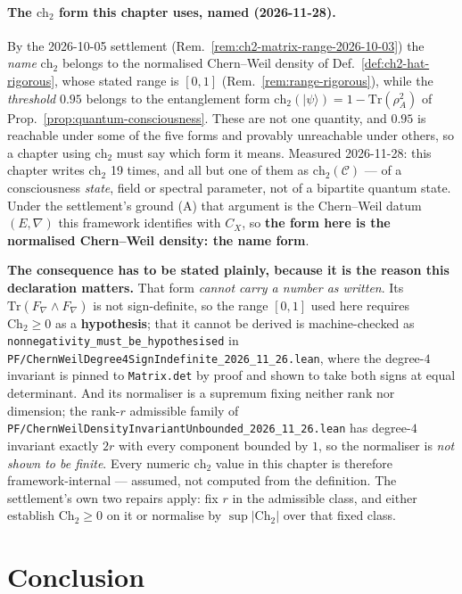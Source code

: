 \paragraph{The $\text{ch}_2$ form this chapter uses, named (2026-11-28).}
By the 2026-10-05 settlement (Rem.~\ref{rem:ch2-matrix-range-2026-10-03}) the
\emph{name} $\text{ch}_2$ belongs to the normalised Chern--Weil density of
Def.~\ref{def:ch2-hat-rigorous}, whose stated range is $[0,1]$
(Rem.~\ref{rem:range-rigorous}), while the \emph{threshold} $0.95$ belongs to the
entanglement form $\text{ch}_2(|\psi\rangle) = 1 - \mathrm{Tr}(\rho_A^2)$ of
Prop.~\ref{prop:quantum-consciousness}. These are not one quantity, and $0.95$ is
reachable under some of the five forms and provably unreachable under others, so a
chapter using $\text{ch}_2$ must say which form it means.
Measured 2026-11-28: this chapter writes $\text{ch}_2$ 19 times, and all but one of them as $\text{ch}_2(\mathcal{C})$
--- of a consciousness \emph{state}, field or spectral parameter, not of a
bipartite quantum state. Under the settlement's ground (A) that argument is the
Chern--Weil datum $(E,\nabla)$ this framework identifies with $C_X$, so
\textbf{the form here is the normalised Chern--Weil density: the name form}.

\noindent \textbf{The consequence has to be stated plainly, because it is the
reason this declaration matters.} That form \emph{cannot carry a number as
written}. Its $\mathrm{Tr}(F_\nabla \wedge F_\nabla)$ is not sign-definite, so the
range $[0,1]$ used here requires $\mathrm{Ch}_2 \geq 0$ as a \textbf{hypothesis};
that it cannot be derived is machine-checked as
\texttt{nonnegativity\_must\_be\_hypothesised} in
\texttt{PF/ChernWeilDegree4SignIndefinite\_2026\_11\_26.lean}, where the
degree-$4$ invariant is pinned to \texttt{Matrix.det} by proof and shown to take
both signs at equal determinant. And its normaliser is a supremum fixing neither
rank nor dimension; the rank-$r$ admissible family of
\texttt{PF/ChernWeilDensityInvariantUnbounded\_2026\_11\_26.lean} has degree-$4$
invariant exactly $2r$ with every component bounded by $1$, so the normaliser is
\emph{not shown to be finite}. Every numeric $\text{ch}_2$ value in this chapter
is therefore framework-internal --- assumed, not computed from the definition.
The settlement's own two repairs apply: fix $r$ in the admissible class, and
either establish $\mathrm{Ch}_2 \geq 0$ on it or normalise by
$\sup|\mathrm{Ch}_2|$ over that fixed class.


\section{Conclusion}

